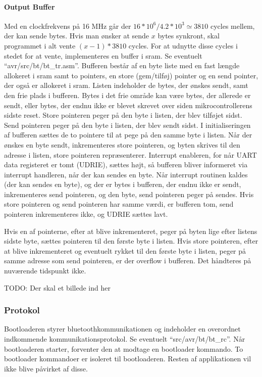 \paragraph{Output Buffer}
Med en clockfrekvens på 16 MHz går der $16*10^6 / 4.2*10^3 \simeq 3810$ cycles mellem, der kan sende bytes. Hvis man ønsker at sende $x$ bytes synkront, skal programmet i alt vente $(x-1)*3810$ cycles. For at udnytte disse cycles i stedet for at vente, implementeres en buffer i sram.
Se eventuelt \mbox{``avr/src/bt/bt\_tr.asm''}.
Bufferen består af en byte liste med en fast længde allokeret i sram samt to pointers, en store (gem/tilføj) pointer og en send pointer, der også er allokeret i sram. Listen indeholder de bytes, der ønskes sendt, samt den frie plads i bufferen. Bytes i det frie område kan være bytes, der allerede er sendt, eller bytes, der endnu ikke er blevet skrevet over siden mikrocontrollerens sidste reset. Store pointeren peger på den byte i listen, der blev tilføjet sidst. Send pointeren peger på den byte i listen, der blev sendt sidst.
I initialiseringen af bufferen sættes de to pointere til at pege på den samme byte i listen.
Når der ønskes en byte sendt, inkrementeres store pointeren, og byten skrives til den adresse i listen, store pointeren repræsenterer. Interrupt enableren, for når UART data registeret er tomt (UDRIE), sættes højt, så bufferen bliver informeret via interrupt handleren, når der kan sendes en byte.
Når interrupt routinen kaldes (der kan sendes en byte), og der er bytes i bufferen, der endnu ikke er sendt, inkrementeres send pointeren, og den byte, send pointeren peger på sendes. Hvis store pointeren og send pointeren har samme værdi, er bufferen tom, send pointeren inkrementeres ikke, og UDRIE sættes lavt.

Hvis en af pointerne, efter at blive inkrementeret, peger på byten lige efter listens sidste byte, sættes pointeren til den første byte i listen.
Hvis store pointeren, efter at blive inkrementeret og eventuelt rykket til den første byte i listen, peger på samme adresse som send pointeren, er der overflow i bufferen. Det håndteres på nuværende tidspunkt ikke.

TODO: Der skal et billede ind her

\subsubsection{Protokol}
Bootloaderen styrer bluetoothkommunikationen og indeholder en overordnet indkommende kommunikationsprotokol.
Se eventuelt \mbox{``src/avr/bt/bt\_rc''}.
Når bootloaderen starter, forventer den at modtage en bootloader kommando.
To bootloader kommandoer er isoleret til bootloaderen. Resten af applikationen vil ikke blive påvirket af disse.

